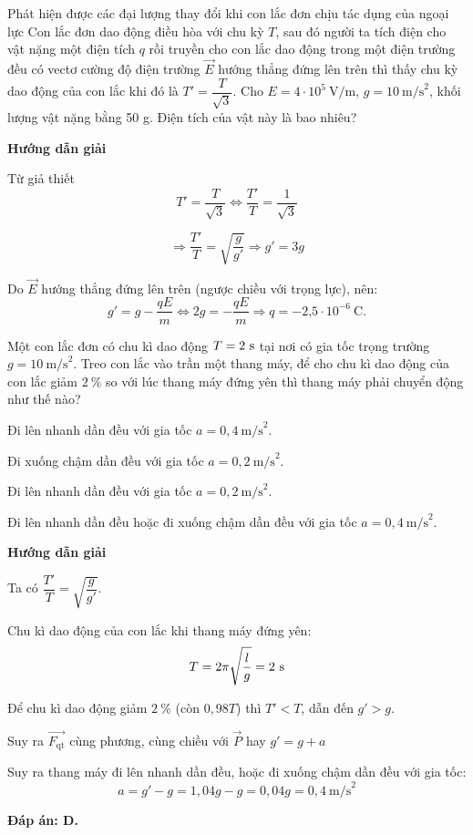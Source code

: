 \begin{dang}{Phát hiện được các đại lượng thay đổi khi con lắc đơn chịu tác dụng của ngoại lực}
	{
		Con lắc đơn dao động điều hòa với chu kỳ $T$, sau đó người ta tích điện cho vật
		nặng một điện tích $q$ rồi truyền cho con lắc dao động trong một điện trường đều có vectơ cường độ điện trường $\vec{E}$ hướng thẳng đứng lên trên thì thấy chu kỳ dao động của con lắc khi đó là $T'= \dfrac{T}{\sqrt{3}}$. Cho $E=4 \cdot 10^{5}\ \text{V/m}$, $g=10\ \text{m/s}^2$, khối lượng vật nặng bằng 50 g. Điện tích của vật này là bao nhiêu?
	}
	{\begin{center}
			\textbf{Hướng dẫn giải}
		\end{center}
		
		Từ giả thiết 
		$$T'=\dfrac{T}{\sqrt 3} \Leftrightarrow \dfrac{T'}{T} = \dfrac{1}{\sqrt 3}$$
		
		$$\Rightarrow \dfrac{T'}{T} =\sqrt{\dfrac{g}{g'}}  \Rightarrow g' =3g$$
		
		Do $\vec{E}$ hướng thẳng đứng lên trên (ngược chiều với trọng lực), nên:
		\begin{equation*}
			g'=g -\dfrac{qE}{m} \Leftrightarrow 2g = - \dfrac {qE}{m} \Rightarrow q =-\text{2,5} \cdot 10^{-6}\ \text{C}.
		\end{equation*}
	}
	{
		Một con lắc đơn có chu kì dao động $T=2\ \text s$ tại nơi có gia tốc trọng trường $g=10\ \text{m/s}^2$. Treo con lắc vào trần một thang máy, để cho chu kì dao động của con lắc giảm $2\ \%$ so với lúc thang máy đứng yên thì thang máy phải chuyển động như thế nào?
		\begin{mcq}
			\item Đi lên nhanh dần đều với gia tốc $a=0,4\ \text{m/s}^2$.
			\item Đi xuống chậm dần đều với gia tốc $a=0,2\ \text{m/s}^2$.
			\item Đi lên nhanh dần đều với gia tốc $a=0,2\ \text{m/s}^2$.
			\item Đi lên nhanh dần đều hoặc đi xuống chậm dần đều với gia tốc $a=0,4\ \text{m/s}^2$.
		\end{mcq}
	}
	{
		\begin{center}
			\textbf{Hướng dẫn giải}
		\end{center}
		
		Ta có $\dfrac{T'}{T}=\sqrt{\dfrac{g}{g'}}$.
		
		Chu kì dao động của con lắc khi thang máy đứng yên:
		$$T=2\pi \sqrt{\dfrac{l}{g}}=2\ \text s$$
		
		Để chu kì dao động giảm $2\ \%$ (còn $0,98T$) thì $T'<T$, dẫn đến $g'>g$.
		
		Suy ra $\overrightarrow{F_{\text{qt}}}$ cùng phương, cùng chiều với $\vec{P}$ hay $g'=g+a$
		
		Suy ra thang máy đi lên nhanh dần đều, hoặc đi xuống chậm dần đều với gia tốc:
		$$a=g'-g=1,04g-g=0,04g=0,4\ \text{m/s}^2$$
		
		\textbf{Đáp án: D.}
	}
\end{dang}